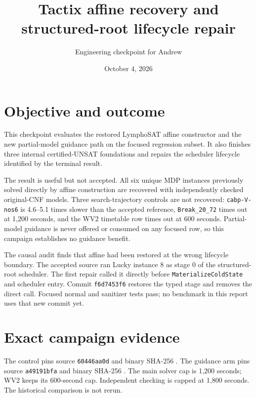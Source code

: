 \documentclass[11pt]{article}
\title{Tactix affine recovery and structured-root lifecycle repair}
\author{Engineering checkpoint for Andrew}
\date{October 4, 2026}
\begin{document}
\maketitle

\section*{Objective and outcome}

This checkpoint evaluates the restored LymphoSAT affine constructor and the
new partial-model guidance path on the focused regression subset. It also
finishes three internal certified-UNSAT foundations and repairs the scheduler
lifecycle identified by the terminal result.

The result is useful but not accepted. All six unique MDP instances previously
solved directly by affine construction are recovered with independently checked
original-CNF models. Three search-trajectory controls are not recovered:
\texttt{cabp-V-nos6} is 4.6--5.1 times slower than the accepted reference,
\texttt{Break\_20\_72} times out at 1,200 seconds, and the WV2 timetable row
times out at 600 seconds. Partial-model guidance is never offered or consumed
on any focused row, so this campaign establishes no guidance benefit.

The causal audit finds that affine had been restored at the wrong lifecycle
boundary. The accepted source ran Lucky instance 8 as stage 0 of the
structured-root scheduler. The first repair called it directly before
\texttt{MaterializeColdState} and scheduler entry. Commit
\texttt{f6d7453f6} restores the typed stage and removes the direct call. Focused
normal and sanitizer tests pass; no benchmark in this report uses that new
commit yet.

\section*{Exact campaign evidence}

The control pins source \texttt{60446aa0d} and binary SHA-256
\texttt{}.
The guidance arm pins source \texttt{a49191bfa} and binary SHA-256
\texttt{}.
The main solver cap is 1,200 seconds; WV2 keeps its 600-second cap. Independent
checking is capped at 1,800 seconds. The historical comparison is not rerun.
\end{document}

